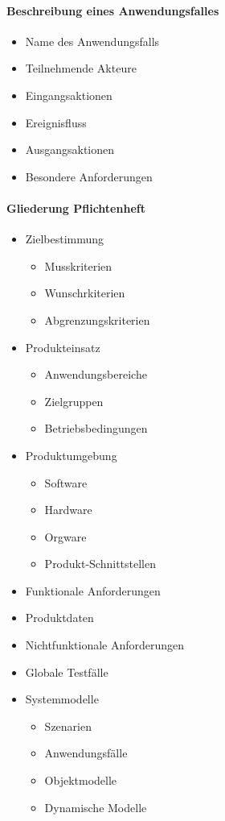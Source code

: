 \documentclass[parskip=full]{scrartcl}
\begin{document}
\paragraph{Beschreibung eines Anwendungsfalles}
\begin{itemize}
	\item Name des Anwendungsfalls
	\item Teilnehmende Akteure
	\item Eingangsaktionen
	\item Ereignisfluss
	\item Ausgangsaktionen
	\item Besondere Anforderungen
\end{itemize}
\paragraph{Gliederung Pflichtenheft}
\begin{itemize}[itemsep=-10pt]
	\item Zielbestimmung
	\begin{itemize}[itemsep=-10pt]
		\item Musskriterien
		\item Wunschrkiterien
		\item Abgrenzungskriterien
	\end{itemize}
	\item Produkteinsatz
	\begin{itemize}[itemsep=-10pt]
		\item Anwendungsbereiche
		\item Zielgruppen
		\item Betriebsbedingungen
	\end{itemize}
	\item Produktumgebung
	\begin{itemize}[itemsep=-10pt]
		\item Software
		\item Hardware
		\item Orgware
		\item Produkt-Schnittstellen
	\end{itemize}
	\item Funktionale Anforderungen
	\item Produktdaten
	\item Nichtfunktionale Anforderungen
	\item Globale Testfälle
	\item Systemmodelle
	\begin{itemize}[itemsep=-10pt]
		\item Szenarien
		\item Anwendungsfälle
		\item Objektmodelle
		\item Dynamische Modelle
	\end{itemize}
\end{itemize}
\end{document}
